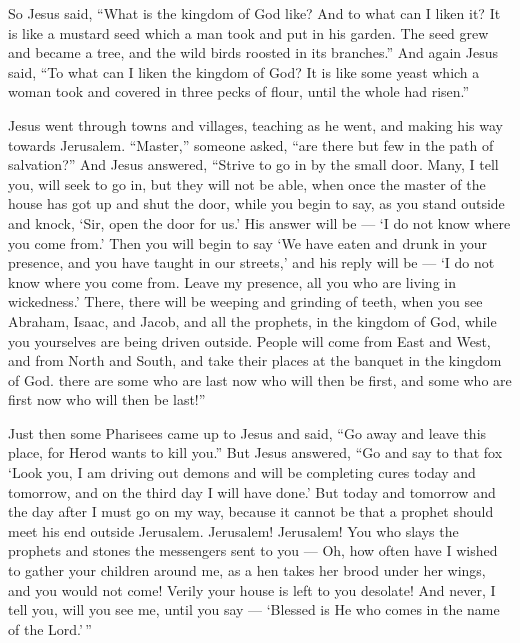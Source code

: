  So Jesus said, ``What is the kingdom of God like? And to
what can I liken it?  It is like a mustard seed which a man
took and put in his garden. The seed grew and became a tree, and the
wild birds roosted in its branches.''  And again Jesus
said, ``To what can I liken the kingdom of God?  It is like
some yeast which a woman took and covered in three pecks of flour, until
the whole had risen.''

 Jesus went through towns and villages, teaching as he
went, and making his way towards Jerusalem.  ``Master,''
someone asked, ``are there but few in the path of salvation?'' And Jesus
answered,  ``Strive to go in by the small door. Many, I
tell you, will seek to go in, but they will not be able, 
when once the master of the house has got up and shut the door, while
you begin to say, as you stand outside and knock, `Sir, open the door
for us.' His answer will be --- `I do not know where you come from.'
 Then you will begin to say `We have eaten and drunk in
your presence, and you have taught in our streets,' and his reply will
be ---  `I do not know where you come from. Leave my
presence, all you who are living in wickedness.'  There,
there will be weeping and grinding of teeth, when you see Abraham,
Isaac, and Jacob, and all the prophets, in the kingdom of God, while you
yourselves are being driven outside.  People will come from
East and West, and from North and South, and take their places at the
banquet in the kingdom of God.  there are some who are last
now who will then be first, and some who are first now who will then be
last!''

 Just then some Pharisees came up to Jesus and said, ``Go
away and leave this place, for Herod wants to kill you.'' 
But Jesus answered, ``Go and say to that fox `Look you, I am driving out
demons and will be completing cures today and tomorrow, and on the third
day I will have done.'  But today and tomorrow and the day
after I must go on my way, because it cannot be that a prophet should
meet his end outside Jerusalem.  Jerusalem! Jerusalem! You
who slays the prophets and stones the messengers sent to you --- Oh, how
often have I wished to gather your children around me, as a hen takes
her brood under her wings, and you would not come!  Verily
your house is left to you desolate! And never, I tell you, will you see
me, until you say --- `Blessed is He who comes in the name of the
Lord.'\,''

